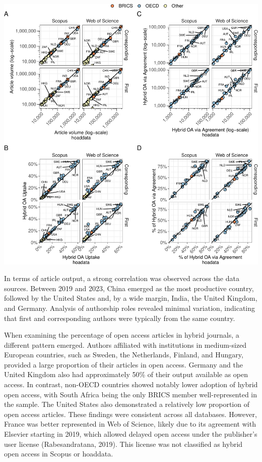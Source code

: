 \documentclass[a4paper,man,floatsintext,longtable,noextraspace,10pt]{apa6}
\begin{document}
\begin{center}
\includegraphics[width=0.99\linewidth,height=\textheight,keepaspectratio]{fig/oa_country_comparision_plot_-1.pdf}
\end{center}

In terms of article output, a strong correlation was observed across the
data sources. Between 2019 and 2023, China emerged as the most
productive country, followed by the United States and, by a wide margin,
India, the United Kingdom, and Germany. Analysis of authorship roles
revealed minimal variation, indicating that first and corresponding
authors were typically from the same country.

When examining the percentage of open access articles in hybrid
journals, a different pattern emerged. Authors affiliated with
institutions in medium-sized European countries, such as Sweden, the
Netherlands, Finland, and Hungary, provided a large proportion of their
articles in open access. Germany and the United Kingdom also had
approximately 50\% of their output available as open access. In
contrast, non-OECD countries showed notably lower adoption of hybrid
open access, with South Africa being the only BRICS member
well-represented in the sample. The United States also demonstrated a
relatively low proportion of open access articles. These findings were
consistent across all databases. However, France was better represented
in Web of Science, likely due to its agreement with Elsevier starting in
2019, which allowed delayed open access under the publisher's user
license (Rabesandratana, 2019). This license was not classified as
hybrid open access in Scopus or hoaddata.
\end{document}
